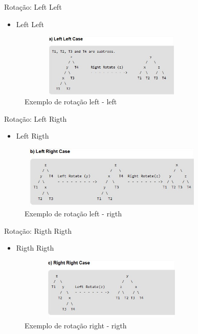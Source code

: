 \begin{frame}
	\begin{block}{Rotação: Left Left}
		\begin{itemize}
			\item Left Left
		\end{itemize}
		\begin{figure}[!htb]
			\centering	  				
			\includegraphics[height=3cm, width = 9cm]{./pic/leftleft.jpg}
			\caption{Exemplo de rotação left - left \cite{GEEKS_2018}}
		\end{figure}
	\end{block}
\end{frame}


\begin{frame}
	\begin{block}{Rotação: Left Rigth}
		\begin{itemize}
			\item Left Rigth
		\end{itemize}
		\begin{figure}[!htb]
			\centering	  				
			\includegraphics[height=3cm, width = 9cm]{./pic/leftRigth.jpg}
			\caption{Exemplo de rotação left - rigth \cite{GEEKS_2018}}
		\end{figure}
	\end{block}
\end{frame}

\begin{frame}
	\begin{block}{Rotação: Rigth Rigth}
		\begin{itemize}
			\item Rigth Rigth
		\end{itemize}
		\begin{figure}[!htb]
			\centering	  				
			\includegraphics[height=3cm, width = 9cm]{./pic/rigthrigth.jpg}
			\caption{Exemplo de rotação right - rigth \cite{GEEKS_2018}}
		\end{figure}
	\end{block}
\end{frame}

